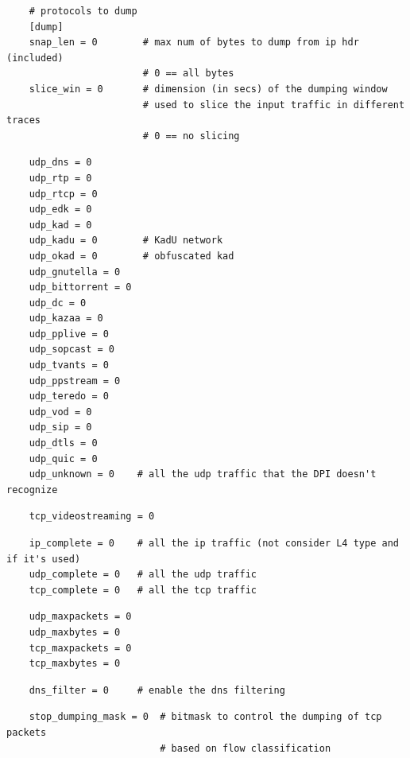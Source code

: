 \documentclass[11pt]{article}
\begin{document}
\begin{small}\begin{verbatim}
    # protocols to dump
    [dump]
    snap_len = 0        # max num of bytes to dump from ip hdr (included)
                        # 0 == all bytes
    slice_win = 0       # dimension (in secs) of the dumping window
                        # used to slice the input traffic in different traces
                        # 0 == no slicing
\end{verbatim}\end{small} \noindent
\begin{small}\begin{verbatim}
    udp_dns = 0
    udp_rtp = 0
    udp_rtcp = 0
    udp_edk = 0
    udp_kad = 0
    udp_kadu = 0        # KadU network
    udp_okad = 0        # obfuscated kad
    udp_gnutella = 0
    udp_bittorrent = 0
    udp_dc = 0
    udp_kazaa = 0
    udp_pplive = 0
    udp_sopcast = 0
    udp_tvants = 0
    udp_ppstream = 0
    udp_teredo = 0
    udp_vod = 0
    udp_sip = 0
    udp_dtls = 0
    udp_quic = 0
    udp_unknown = 0    # all the udp traffic that the DPI doesn't recognize
\end{verbatim}\end{small} \noindent
\begin{small}\begin{verbatim}
    tcp_videostreaming = 0
\end{verbatim}\end{small} \noindent
\begin{small}\begin{verbatim}
    ip_complete = 0    # all the ip traffic (not consider L4 type and if it's used)
    udp_complete = 0   # all the udp traffic
    tcp_complete = 0   # all the tcp traffic
\end{verbatim}\end{small} \noindent
\begin{small}\begin{verbatim}
    udp_maxpackets = 0
    udp_maxbytes = 0
    tcp_maxpackets = 0
    tcp_maxbytes = 0
\end{verbatim}\end{small} \noindent
\begin{small}\begin{verbatim}
    dns_filter = 0     # enable the dns filtering
\end{verbatim}\end{small} \noindent
\begin{small}\begin{verbatim}
    stop_dumping_mask = 0  # bitmask to control the dumping of tcp packets
                           # based on flow classification
\end{verbatim}\end{small} \noindent
\end{document}
